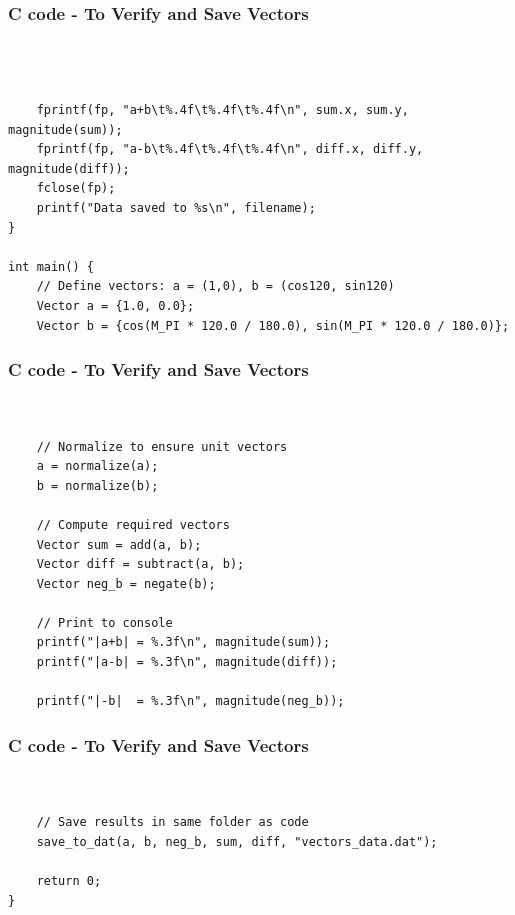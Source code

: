 \documentclass{beamer}
\begin{document}
\begin{frame}[fragile]                            
\frametitle{C code - To Verify and Save Vectors}                
\begin{lstlisting}



    fprintf(fp, "a+b\t%.4f\t%.4f\t%.4f\n", sum.x, sum.y, magnitude(sum));
    fprintf(fp, "a-b\t%.4f\t%.4f\t%.4f\n", diff.x, diff.y, magnitude(diff));
    fclose(fp);
    printf("Data saved to %s\n", filename);
}

int main() {
    // Define vectors: a = (1,0), b = (cos120, sin120)
    Vector a = {1.0, 0.0};
    Vector b = {cos(M_PI * 120.0 / 180.0), sin(M_PI * 120.0 / 180.0)};
   \end{lstlisting}
\end{frame}


\begin{frame}[fragile]                            
\frametitle{C code - To Verify and Save Vectors}                
\begin{lstlisting}

 
    // Normalize to ensure unit vectors
    a = normalize(a);
    b = normalize(b);
    
    // Compute required vectors
    Vector sum = add(a, b);
    Vector diff = subtract(a, b);
    Vector neg_b = negate(b);
    
    // Print to console
    printf("|a+b| = %.3f\n", magnitude(sum));
    printf("|a-b| = %.3f\n", magnitude(diff));

    printf("|-b|  = %.3f\n", magnitude(neg_b));
\end{lstlisting}
\end{frame}


\begin{frame}[fragile]                            
\frametitle{C code - To Verify and Save Vectors}                
\begin{lstlisting}

    
    // Save results in same folder as code
    save_to_dat(a, b, neg_b, sum, diff, "vectors_data.dat");
    
    return 0;
}

\end{lstlisting}
\end{frame}
\end{document}
